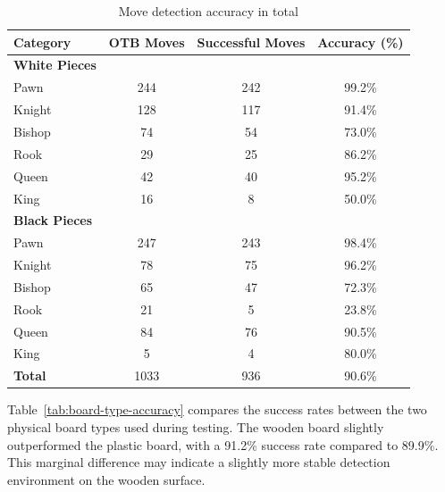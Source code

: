 \begin{table}[htbp]
\centering
\caption{Move detection accuracy in total}
\label{tab:accuracy-total}
\begin{tabular}{lccc}
\toprule
\textbf{Category} & \textbf{OTB Moves} & \textbf{Successful Moves} & \textbf{Accuracy (\%)} \\
\midrule
\textbf{White Pieces} & & & \\
\hspace{1em}Pawn  & 244 & 242 & 99.2\% \\
\hspace{1em}Knight & 128 & 117 & 91.4\% \\
\hspace{1em}Bishop & 74  & 54  & 73.0\% \\
\hspace{1em}Rook   & 29  & 25  & 86.2\% \\
\hspace{1em}Queen  & 42  & 40  & 95.2\% \\
\hspace{1em}King   & 16  & 8   & 50.0\% \\
\midrule
\textbf{Black Pieces} & & & \\
\hspace{1em}Pawn  & 247 & 243 & 98.4\% \\
\hspace{1em}Knight & 78  & 75  & 96.2\% \\
\hspace{1em}Bishop & 65  & 47  & 72.3\% \\
\hspace{1em}Rook   & 21  & 5   & 23.8\% \\
\hspace{1em}Queen  & 84  & 76  & 90.5\% \\
\hspace{1em}King   & 5   & 4   & 80.0\% \\
\midrule
\textbf{Total} & 1033 & 936 & 90.6\% \\
\bottomrule
\end{tabular}
\end{table}


Table~\ref{tab:board-type-accuracy} compares the success rates between the two physical board types used during testing. The wooden board slightly outperformed the plastic board, with a 91.2\% success rate compared to 89.9\%. This marginal difference may indicate a slightly more stable detection environment on the wooden surface. \\


